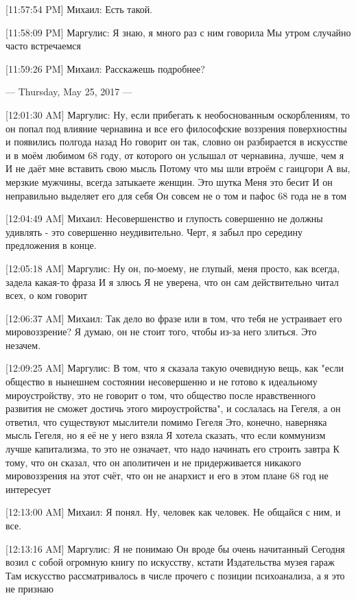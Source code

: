 \documentclass{article}
\begin{document}
{[11:57:54 PM] Михаил:
Есть такой.

[11:58:09 PM] Маргулис:
Я знаю, я много раз с ним говорила
 Мы утром случайно часто встречаемся

[11:59:26 PM] Михаил:
Расскажешь подробнее?

--- Thursday, May 25, 2017 ---

[12:01:30 AM] Маргулис:
Ну, если прибегать к необоснованным оскорблениям, то он попал под влияние чернавина и все его философские воззрения поверхностны и появились полгода назад
 Но говорит он так, словно он разбирается в искусстве и в моём любимом 68 году, от которого он услышал от чернавина, лучше, чем я
 И не даёт мне вставить свою мысль
 Потому что мы шли втроём с гаицгори
 А вы, мерзкие мужчины, всегда затыкаете женщин. Это шутка
 Меня это бесит
 И он неправильно выделяет его для себя
 Он совсем не о том и пафос 68 года не в том

[12:04:49 AM] Михаил:
Несовершенство и глупость совершенно не должны удивлять - это совершенно неудивительно.
 Черт, я забыл про середину предложения в конце.

[12:05:18 AM] Маргулис:
Ну он, по-моему, не глупый, меня просто, как всегда, задела какая-то фраза
 И я злюсь
 Я не уверена, что он сам действительно читал всех, о ком говорит

[12:06:37 AM] Михаил:
Так дело во фразе или в том, что тебя не устраивает его мировоззрение?
 Я думаю, он не стоит того, чтобы из-за него злиться.
 Это незачем.

[12:09:25 AM] Маргулис:
В том, что я сказала такую очевидную вещь, как "если общество в нынешнем состоянии несовершенно и не готово к идеальному мироустройству, это не говорит о том, что общество после нравственного развития не сможет достичь этого мироустройства", и сослалась на Гегеля, а он ответил, что существуют мыслители помимо Гегеля
 Это, конечно, наверняка мысль Гегеля, но я её не у него взяла
 Я хотела сказать, что если коммунизм лучше капитализма, то это не означает, что надо начинать его строить завтра
 К тому, что он сказал, что он аполитичен и не придерживается никакого мировоззрения на этот счёт, что он не анархист и его в этом плане 68 год не интересует

[12:13:00 AM] Михаил:
Я понял. Ну, человек как человек. Не общайся с ним, и все.

[12:13:16 AM] Маргулис:
Я не понимаю
 Он вроде бы очень начитанный
 Сегодня возил с собой огромную книгу по искусству, кстати
 Издательства музея гараж
 Там искусство рассматривалось в числе прочего с позиции психоанализа, а я это не признаю

}
\end{document}
